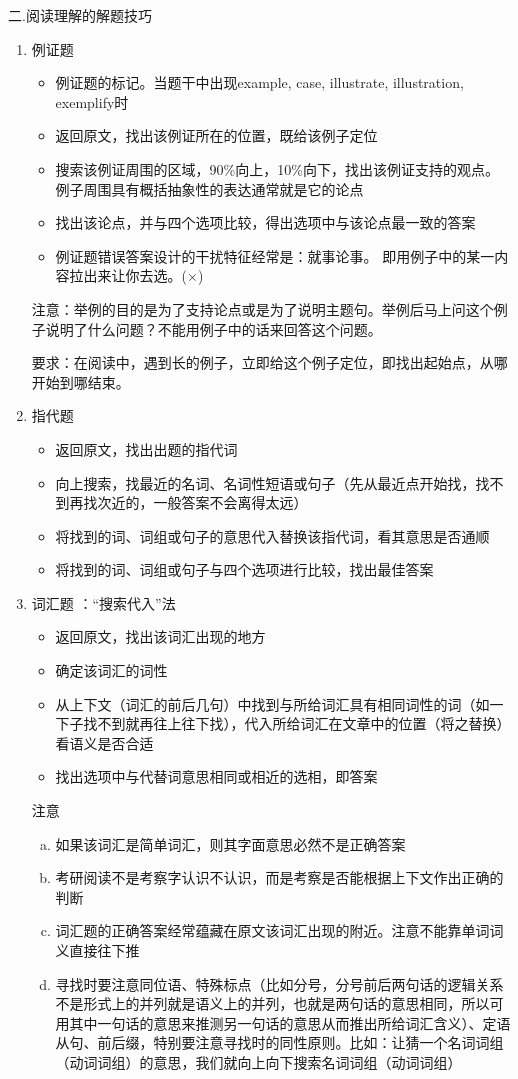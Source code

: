 \documentclass[11pt,twoside,openany,x11names,svgnames]{memoir}
\newcommand{\hei}{\CJKfamily{hei}}      %
\begin{document}
二.阅读理解的解题技巧
\begin{enumerate}
  \item 例证题
  \begin{itemize}
  \item 例证题的标记。当题干中出现example, case, illustrate, illustration, exemplify时
  \item 返回原文，找出该例证所在的位置，既给该例子定位
  \item 搜索该例证周围的区域，90\%{}向上，10\%{}向下，找出该例证支持的观点。例子周围具有概括抽象性的表达通常就是它的论点
  \item 找出该论点，并与四个选项比较，得出选项中与该论点最一致的答案
  \item 例证题错误答案设计的干扰特征经常是：就事论事。 即用例子中的某一内容拉出来让你去选。($\times$)
\end{itemize}

{\hei 注意}：举例的目的是为了支持论点或是为了说明主题句。举例后马上问这个例子说明了什么问题？不能用例子中的话来回答这个问题。

要求：在阅读中，遇到长的例子，立即给这个例子定位，即找出起始点，从哪开始到哪结束。
\item 指代题
\begin{itemize}
  \item 返回原文，找出出题的指代词
  \item 向上搜索，找最近的名词、名词性短语或句子（先从最近点开始找，找不到再找次近的，一般答案不会离得太远）
  \item 将找到的词、词组或句子的意思代入替换该指代词，看其意思是否通顺
  \item 将找到的词、词组或句子与四个选项进行比较，找出最佳答案
\end{itemize}
\item 词汇题 ：“搜索代入”法
\begin{itemize}
  \item 返回原文，找出该词汇出现的地方
  \item 确定该词汇的词性
  \item 从上下文（词汇的前后几句）中找到与所给词汇具有相同词性的词（如一下子找不到就再往上往下找），代入所给词汇在文章中的位置（将之替换）看语义是否合适
  \item 找出选项中与代替词意思相同或相近的选相，即答案
\end{itemize}

{\hei 注意}
\begin{enumerate}[a.]
  \item 如果该词汇是简单词汇，则其字面意思必然不是正确答案
  \item 考研阅读不是考察字认识不认识，而是考察是否能根据上下文作出正确的判断
  \item 词汇题的正确答案经常蕴藏在原文该词汇出现的附近。注意不能靠单词词义直接往下推
  \item 寻找时要注意同位语、特殊标点（比如分号，分号前后两句话的逻辑关系不是形式上的并列就是语义上的并列，也就是两句话的意思相同，所以可用其中一句话的意思来推测另一句话的意思从而推出所给词汇含义）、定语从句、前后缀，特别要注意寻找时的同性原则。比如：让猜一个名词词组（动词词组）的意思，我们就向上向下搜索名词词组（动词词组）
\end{enumerate}


\end{enumerate}
\end{document}

